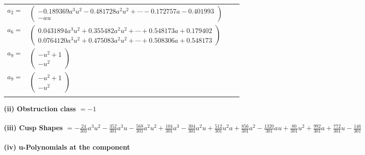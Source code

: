 \documentclass[1p]{elsarticle_modified}
\theoremstyle{definition}
\begin{document}
\begin{tabular}{m{7pt} m{180pt} m{7pt} m{180pt} }
\flushright $a_{2}=$&$\begin{pmatrix}-0.189369 a^{3} u^{2}-0.481728 a^{2} u^{2}+\cdots-0.172757 a-0.401993\\- a u\end{pmatrix}$ \\
\flushright $a_{6}=$&$\begin{pmatrix}0.0431894 a^{3} u^{2}+0.355482 a^{2} u^{2}+\cdots+0.548173 a+0.179402\\0.0764120 a^{3} u^{2}+0.475083 a^{2} u^{2}+\cdots+0.508306 a+0.548173\end{pmatrix}$ \\
\flushright $a_{9}=$&$\begin{pmatrix}- u^2+1\\- u^2\end{pmatrix}$\\ \flushright $a_{9}=$&$\begin{pmatrix}- u^2+1\\- u^2\end{pmatrix}$\\&\end{tabular}
\flushleft \textbf{(ii) Obstruction class $= -1$}\\~\\
\flushleft \textbf{(iii) Cusp Shapes $= -\frac{24}{301} a^3 u^2-\frac{352}{301} a^3 u-\frac{568}{301} a^2 u^2+\frac{104}{301} a^3-\frac{304}{301} a^2 u+\frac{512}{301} u^2 a+\frac{856}{301} a^2-\frac{1320}{301} a u+\frac{80}{301} u^2+\frac{992}{301} a+\frac{772}{301} u-\frac{146}{301}$}\\~\\
\newpage\renewcommand{\arraystretch}{1}
\flushleft \textbf{(iv) u-Polynomials at the component}\newline \\
\end{document}
